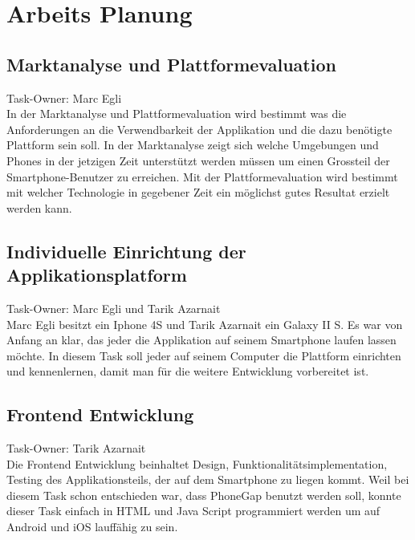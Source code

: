 
\newpage
\section{Arbeits Planung} %
\label{sec:arbeits_planung}

\subsection{Marktanalyse und Plattformevaluation} %
\label{sub:marktanalyse_und_platformevaluation}
Task-Owner: Marc Egli\\
In der Marktanalyse und Plattformevaluation wird bestimmt was die Anforderungen an die Verwendbarkeit der Applikation und die dazu benötigte Plattform sein soll. In der Marktanalyse zeigt sich welche Umgebungen und Phones in der jetzigen Zeit unterstützt werden müssen um einen Grossteil der Smartphone-Benutzer zu erreichen. Mit der Plattformevaluation wird bestimmt mit welcher Technologie in gegebener Zeit ein möglichst gutes Resultat erzielt werden kann.

\subsection{Individuelle Einrichtung der Applikationsplatform} %
\label{sub:individuelle_einrichtung_der_applikationsplatform}
Task-Owner: Marc Egli und Tarik Azarnait\\
Marc Egli besitzt ein Iphone 4S und Tarik Azarnait ein Galaxy II S. Es war von Anfang an klar, das jeder die Applikation auf seinem Smartphone laufen lassen möchte. In diesem Task soll jeder auf seinem Computer die Plattform einrichten und kennenlernen, damit man für die weitere Entwicklung vorbereitet ist. 

\subsection{Frontend Entwicklung} %
\label{sub:frontend_entwicklung}
Task-Owner: Tarik Azarnait\\
Die Frontend Entwicklung beinhaltet Design, Funktionalitätsimplementation, Testing des Applikationsteils, der auf dem Smartphone zu liegen kommt. Weil bei diesem Task schon entschieden war, dass PhoneGap benutzt werden soll, konnte dieser Task einfach in HTML und Java Script programmiert werden um auf Android und iOS lauffähig zu sein. 

